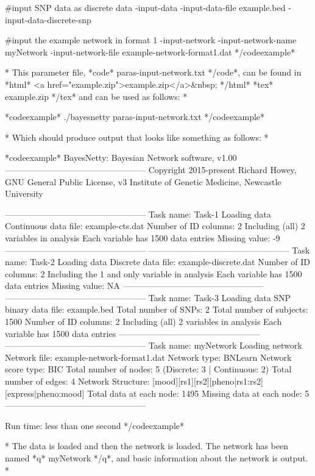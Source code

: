 #input SNP data as discrete data -input-data -input-data-file example.bed -input-data-discrete-snp

#input the example network in format 1 -input-network -input-network-name myNetwork -input-network-file example-network-format1.dat */codeexample*

* This parameter file, *code* paras-input-network.txt */code*, can be found in *html* <a href="example.zip">example.zip</a>&nbsp; */html* *tex* example.zip */tex* and can be used as follows: *

*codeexample* ./bayesnetty paras-input-network.txt */codeexample*

* Which should produce output that looks like something as follows: *

*codeexample* BayesNetty: Bayesian Network software, v1.00 -------------------------------------------------- Copyright 2015-present Richard Howey, GNU General Public License, v3 Institute of Genetic Medicine, Newcastle University

-------------------------------------------------- Task name: Task-1 Loading data Continuous data file: example-cts.dat Number of ID columns: 2 Including (all) 2 variables in analysis Each variable has 1500 data entries Missing value: -9 -------------------------------------------------- -------------------------------------------------- Task name: Task-2 Loading data Discrete data file: example-discrete.dat Number of ID columns: 2 Including the 1 and only variable in analysis Each variable has 1500 data entries Missing value: NA -------------------------------------------------- -------------------------------------------------- Task name: Task-3 Loading data SNP binary data file: example.bed Total number of SNPs: 2 Total number of subjects: 1500 Number of ID columns: 2 Including (all) 2 variables in analysis Each variable has 1500 data entries -------------------------------------------------- -------------------------------------------------- Task name: myNetwork Loading network Network file: example-network-format1.dat Network type: BNLearn Network score type: BIC Total number of nodes: 5 (Discrete: 3 | Continuous: 2) Total number of edges: 4 Network Structure: [mood][rs1][rs2][pheno|rs1:rs2][express|pheno:mood] Total data at each node: 1495 Missing data at each node: 5 --------------------------------------------------

Run time: less than one second */codeexample*

* The data is loaded and then the network is loaded. The network has been named *q* myNetwork */q*, and basic information about the network is output. *

